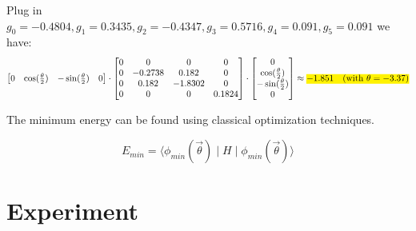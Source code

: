 \documentclass{article}
\begin{document}
Plug in  \(g_0 = -0.4804, g_1 = 0.3435, g_2 = -0.4347, g_3 = 0.5716, g_4 = 0.091, g_5 = 0.091\) we have:
\[
	\begin{bmatrix}
		0 & \cos(\frac{\theta}{2}) & -\sin(\frac{\theta}{2}) & 0
	\end{bmatrix}
	\cdot
	\begin{bmatrix}
		0 & 0       & 0       & 0      \\
		0 & -0.2738 & 0.182   & 0      \\
		0 & 0.182   & -1.8302 & 0      \\
		0 & 0       & 0       & 0.1824
	\end{bmatrix}
	\cdot
	\begin{bmatrix}
		0                        \\
		\cos(\frac{\theta}{2})   \\
		- \sin(\frac{\theta}{2}) \\
		0
	\end{bmatrix}
	\approx \text{\hl{$-1.851 \quad (\text{with } \theta = -3.37)$}}
\]


The minimum energy can be found using classical optimization techniques.

\[E_{min} = \langle \phi_{min}(\vec{\theta}) \mid H \mid \phi_{min}(\vec{\theta}) \rangle\]

\section{Experiment}
\end{document}
